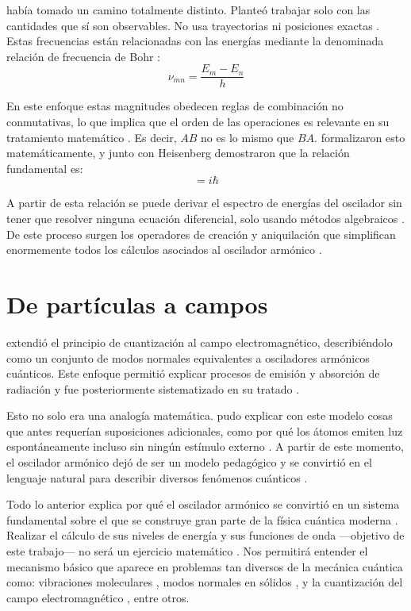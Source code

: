 \cite{heisenberg1925} había tomado un camino totalmente distinto. Planteó trabajar solo con las cantidades que sí son observables. No usa trayectorias ni posiciones exactas \citep{heisenberg1927}. Estas frecuencias están relacionadas con las energías mediante la denominada relación de frecuencia de Bohr \citep{bohr1913}:
\vspace{-10pt}
\begin{equation}
	\nu_{mn} = \frac{E_m - E_n}{h}
\end{equation}

En este enfoque estas magnitudes obedecen reglas de combinación no conmutativas, lo que implica que el orden de las operaciones es relevante en su tratamiento matemático \citep{heisenberg1925}. Es decir, $AB$ no es lo mismo que $BA$. \cite{born1925} formalizaron esto matemáticamente, y junto con Heisenberg \cite{bornheisenberg1926} demostraron que la relación fundamental es:
\vspace{-10pt}
\begin{equation}
	[\hat{q}, \hat{p}] = i\hbar
\end{equation}

A partir de esta relación \citep{bornheisenberg1926} se puede derivar el espectro de energías del oscilador sin tener que resolver ninguna ecuación diferencial, solo usando métodos algebraicos \citep{dirac1930}. De este proceso surgen los operadores de creación y aniquilación que simplifican enormemente todos los cálculos asociados al oscilador armónico \citep{dirac1930}.

\section{De partículas a campos}

\cite{dirac1927} extendió el principio de cuantización al campo electromagnético, describiéndolo como un conjunto de modos normales equivalentes a osciladores armónicos cuánticos. Este enfoque permitió explicar procesos de emisión y absorción de radiación y fue posteriormente sistematizado en su tratado \citep{dirac1930}.

Esto no solo era una analogía matemática. \cite{dirac1927} pudo explicar con este modelo cosas que antes requerían suposiciones adicionales, como por qué los átomos emiten luz espontáneamente incluso sin ningún estímulo externo \citep{dirac1927}. A partir de este momento, el oscilador armónico \citep{dirac1930} dejó de ser un modelo pedagógico y se convirtió en el lenguaje natural para describir diversos fenómenos cuánticos \citep{dirac1930, bornheisenberg1926}. 

Todo lo anterior explica por qué el oscilador armónico \citep{schrodinger1926a, dirac1930} se convirtió en un sistema fundamental sobre el que se construye gran parte de la física cuántica moderna \citep{dirac1930, bornheisenberg1926}. Realizar el cálculo de sus niveles de energía y sus funciones de onda ---objetivo de este trabajo--- no será un ejercicio matemático \citep{dirac1930}. Nos permitirá entender el mecanismo básico \citep{dirac1930} que aparece en problemas tan diversos de la mecánica cuántica como: vibraciones moleculares \citep{einstein1907}, modos normales en sólidos \citep{debye1912}, y la cuantización del campo electromagnético \citep{dirac1927}, entre otros.